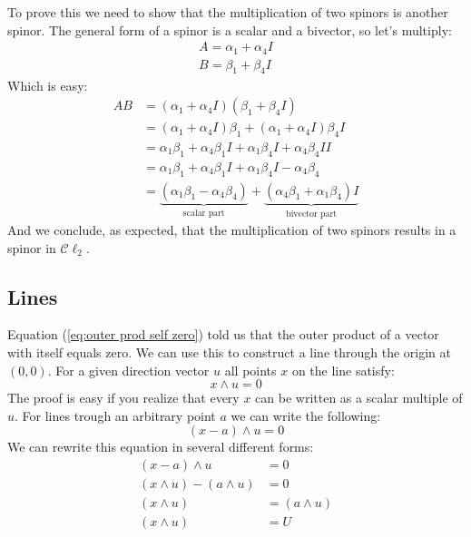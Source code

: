 \documentclass[10pt]{report}
\begin{document}
To prove this we need to show that the multiplication of two
spinors is another spinor. The general form of a spinor is a
scalar and a bivector, so let's multiply:
\begin{align*}
    A = \alpha_1 + \alpha_4I \\
    B = \beta_1  + \beta_4I
\end{align*}
Which is easy:
\begin{align*}
    AB &= (\alpha_1 + \alpha_4I)(\beta_1  + \beta_4I) \\
       &= (\alpha_1 + \alpha_4I)\beta_1  + (\alpha_1 + \alpha_4I)\beta_4I \\
       &= \alpha_1\beta_1 + \alpha_4\beta_1I  + \alpha_1\beta_4I + \alpha_4\beta_4II \\
       &= \alpha_1\beta_1 + \alpha_4\beta_1I  + \alpha_1\beta_4I - \alpha_4\beta_4 \\
       &= \underbrace{(\alpha_1\beta_1 - \alpha_4\beta_4)}_{\text{scalar part}} + \underbrace{(\alpha_4\beta_1 + \alpha_1\beta_4)I}_{\text{bivector part}}
\end{align*}
And we conclude, as expected, that the multiplication of two
spinors results in a spinor in $\mathcal{C}\ell_2$.

\subsection{Lines}

Equation (\ref{eq:outer prod self zero}) told us that the outer
product of a vector with itself equals zero. We can use this to
construct a line through the origin at $(0, 0)$. For a given
direction vector $u$ all points $x$ on the line satisfy:
\begin{displaymath}
    x\wedge u = 0
\end{displaymath}
The proof is easy if you realize that every $x$ can be written as
a scalar multiple of $u$. For lines trough an arbitrary point $a$
we can write the following:
\begin{displaymath}
    (x-a)\wedge u = 0
\end{displaymath}
We can rewrite this equation in several different forms:
\begin{align}
    (x-a)\wedge u &= 0                \nonumber \\
    (x \wedge u) - (a\wedge u) &= 0   \nonumber \\
    (x \wedge u) &= (a\wedge u)       \nonumber \\
    (x \wedge u) &= U                 \nonumber
\end{align}
\end{document}
